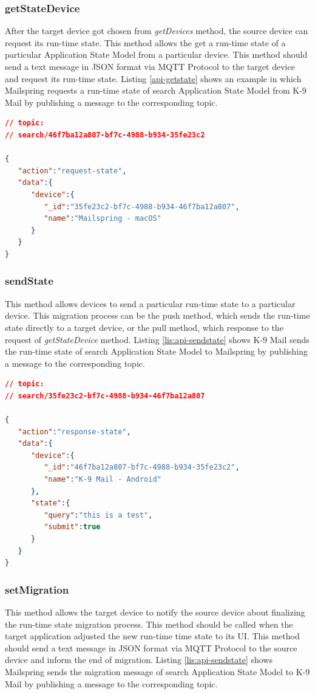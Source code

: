 \subsubsection{getStateDevice}
After the target device got chosen from \textit{getDevices} method, the source device can request its run-time state. This method allows the get a run-time state of a particular Application State Model from a particular device. This method should send a text message in JSON format via MQTT Protocol to the target device and request its run-time state. Listing \ref{api-getstate} shows an example in which Mailspring requests a run-time state of search Application State Model from K-9 Mail by publishing a message to the corresponding topic.

\lstset{
  label=lis:api-getstate,caption=Mailspring request a run-time state from K-9 Mail.
}
\begin{lstlisting}[language=json]
// topic:
// search/46f7ba12a807-bf7c-4988-b934-35fe23c2

{
   "action":"request-state",
   "data":{
      "device":{
         "_id":"35fe23c2-bf7c-4988-b934-46f7ba12a807",
         "name":"Mailspring - macOS"
      }
   }
}
\end{lstlisting}
\subsubsection{sendState}
This method allows devices to send a particular run-time state to a particular device. This migration process can be the push method, which sends the run-time state directly to a target device, or the pull method, which response to the request of \textit{getStateDevice} method. Listing \ref{lis:api-sendstate} shows K-9 Mail sends the run-time state of search Application State Model to Mailspring by publishing a message to the corresponding topic.

\lstset{
  label=lis:api-sendstate,caption=K-9 Mail sends run-time state of search to Mailspring.
}
\begin{lstlisting}[language=json]
// topic:
// search/35fe23c2-bf7c-4988-b934-46f7ba12a807

{
   "action":"response-state",
   "data":{
      "device":{
         "_id":"46f7ba12a807-bf7c-4988-b934-35fe23c2",
         "name":"K-9 Mail - Android"
      },
      "state":{
         "query":"this is a test",
         "submit":true
      }
   }
}
\end{lstlisting}

\subsubsection{setMigration}
This method allows the target device to notify the source device about finalizing the run-time state migration process. This method should be called when the target application adjusted the new run-time time state to its UI. This method should send a text message in JSON format via MQTT Protocol to the source device and inform the end of migration. Listing \ref{lis:api-sendstate} shows Mailspring sends the migration message of search Application State Model to K-9 Mail by publishing a message to the corresponding topic.

